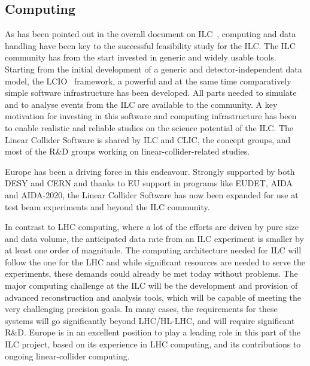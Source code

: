 \documentclass[%
 reprint,
 floatfix,
 amsmath,amssymb,
 aps,
]{revtex4-1}
\begin{document}
\subsection{Computing}
As has been pointed out in the overall document on ILC~\cite{ILCforESS}, computing and data 
handling have been key to the successful feasibility study for the ILC. The ILC community 
has from the start invested in generic and widely usable tools. Starting from 
the initial development of a generic and detector-independent data model, the 
LCIO~\cite{bib:lcio} framework, a powerful and at the same time comparatively simple software 
infrastructure has been developed. All parts needed to simulate and to analyse 
events from the ILC are available to the community. A key motivation for investing
in this software and computing infrastructure has been to enable realistic and reliable 
studies on the science potential of the ILC. The Linear Collider Software is shared by ILC and 
CLIC, the concept groups, and most of the R\&D groups working on linear-collider-related 
studies. 

Europe has been a driving force in this endeavour. Strongly 
supported by both DESY and CERN and thanks to EU support in programs like EUDET, 
AIDA and AIDA-2020, the Linear Collider Software has now been expanded for use at test 
beam experiments and beyond the ILC     community.

In contrast to LHC computing, where a lot of the efforts are driven by pure 
size and data volume, the anticipated data rate from an ILC experiment is 
smaller by at least one order of magnitude. The computing architecture needed for 
ILC will follow the one for the LHC and while significant resources are needed 
to serve the experiments, these demands could already be met today without problems. 
The major computing challenge at the ILC will be the development and provision 
of advanced reconstruction and analysis tools, which will be capable of meeting 
the very challenging precision goals. In many cases, the requirements 
for these systems will go significantly beyond LHC/HL-LHC, 
and will require significant R\&D. Europe is in an excellent position to play a 
leading role in this part of the ILC project, based on its experience in LHC 
computing, and its contributions to ongoing linear-collider computing. 
\end{document}
